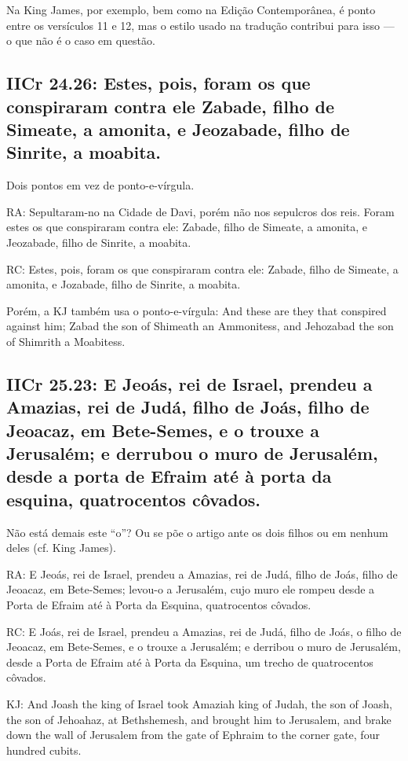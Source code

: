 Na King James, por exemplo, bem como na Edição Contemporânea, é ponto
entre os versículos 11 e 12, mas o estilo usado na tradução contribui
para isso --- o que não é o caso em questão.


\subsection{IICr 24.26: Estes, pois, foram os que conspiraram contra ele\uwave{;} Zabade, filho de Simeate, a amonita, e Jeozabade, filho de Sinrite, a moabita.}
Dois pontos em vez de ponto-e-vírgula.

RA: Sepultaram-no na Cidade de Davi, porém não nos sepulcros dos reis. Foram estes os que conspiraram contra ele: Zabade, filho de Simeate, a amonita, e Jeozabade, filho de Sinrite, a moabita.

RC: Estes, pois, foram os que conspiraram contra ele: Zabade, filho de Simeate, a amonita, e Jozabade, filho de Sinrite, a moabita.

Porém, a KJ também usa o ponto-e-vírgula: And these are they that conspired against him; Zabad the son of Shimeath an Ammonitess, and Jehozabad the son of Shimrith a Moabitess.       

\subsection{IICr 25.23: E Jeoás, rei de Israel, prendeu a Amazias, rei de Judá, filho de Joás,  filho de Jeoacaz, em Bete-Semes, e o trouxe a Jerusalém; e derrubou o muro de Jerusalém, desde a porta de Efraim até à porta da esquina, quatrocentos côvados.}
Não está demais este ``o''? Ou se põe o artigo ante os dois filhos ou
em nenhum deles (cf. King James).

RA: E Jeoás, rei de Israel, prendeu a Amazias, rei de Judá, filho de Joás, filho de Jeoacaz, em Bete-Semes; levou-o a Jerusalém, cujo muro ele rompeu desde a Porta de Efraim até à Porta da Esquina, quatrocentos côvados.

RC:  E Joás, rei de Israel, prendeu a Amazias, rei de Judá, filho de Joás, o filho de Jeoacaz, em Bete-Semes, e o trouxe a Jerusalém; e derribou o muro de Jerusalém, desde a Porta de Efraim até à Porta da Esquina, um trecho de quatrocentos côvados.

KJ: And Joash the king of Israel took Amaziah king of Judah, the son of Joash, the son of Jehoahaz, at Bethshemesh, and brought him to Jerusalem, and brake down the wall of Jerusalem from the gate of Ephraim to the corner gate, four hundred cubits.

